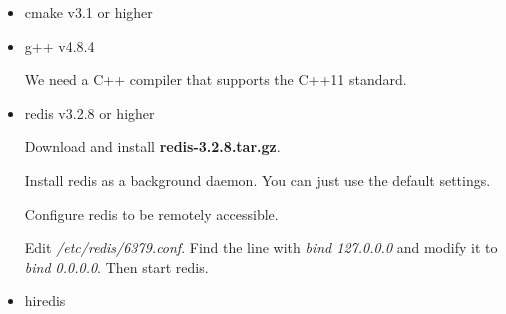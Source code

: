 \documentclass[letterpaper,12pt]{article}
\begin{document}
\begin{itemize}

\item cmake v3.1 or higher

\begin{center}
\noindent{}
\end{center}

\item g++ v4.8.4

We need a C++ compiler that supports the C++11 standard.

\begin{center}
\noindent{}
\end{center}

\item redis v3.2.8 or higher

Download and install {\bf redis-3.2.8.tar.gz}.

\begin{center}
\noindent{}
\end{center}

Install redis as a background daemon. You can just use the default settings.

\begin{center}
\noindent{}
\end{center}

Configure redis to be remotely accessible.
%

\begin{center}
\noindent{}
\end{center}

Edit {\sl /etc/redis/6379.conf}. Find the line with {\em bind 127.0.0.0}
and modify it to {\em bind 0.0.0.0}. Then start redis.

%
\begin{center}
\noindent{}
\end{center}

\item hiredis


\end{itemize}
\end{document}
